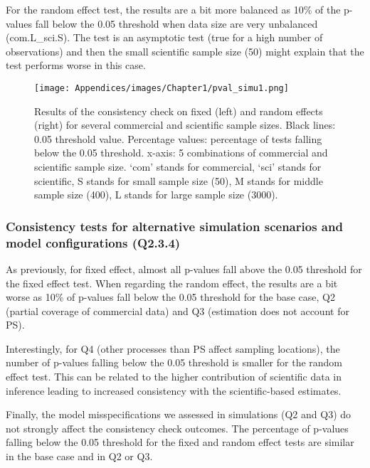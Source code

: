 For the random effect test, the results are a bit more balanced as 10\% of the p-values fall below the 0.05 threshold when data size are very unbalanced (com.L_sci.S). The test is an asymptotic test (true for a high number of observations) and then the small scientific sample size (50) might explain that the test performs worse in this case.

\begin{figure}[H]
   \begin{center}
      \texttt{[image: Appendices/images/Chapter1/pval\_simu1.png]}
   \end{center}
   \caption[Results of the consistency check on fixed (left) and random effects (right) for several commercial and scientific sample sizes.]
   {Results of the consistency check on fixed (left) and random effects (right) for several commercial and scientific sample sizes. Black lines: 0.05 threshold value. Percentage values: percentage of tests falling below the 0.05 threshold. x-axis: 5 combinations of commercial and scientific sample size. ‘com’ stands for commercial, ‘sci’ stands for scientific, S stands for small sample size (50), M stands for middle sample size (400), L stands for large sample size (3000).}
   \label{fig:PvalSimu1}
\end{figure}

\clearpage

\subsubsection{Consistency tests for alternative simulation scenarios and model configurations (Q2.3.4)}\label{appendix:PvalSimu2}

As previously, for fixed effect, almost all p-values fall above the 0.05 threshold for the fixed effect test. When regarding the random effect, the results are a bit worse as 10\% of p-values fall below the 0.05 threshold for the base case, Q2 (partial coverage of commercial data) and Q3 (estimation does not account for PS).

Interestingly, for Q4 (other processes than PS affect sampling locations), the number of p-values falling below the 0.05 threshold is smaller for the random effect test. This can be related to the higher contribution of scientific data in inference leading to increased consistency with the scientific-based estimates.

Finally, the model misspecifications we assessed in simulations (Q2 and Q3) do not strongly affect the consistency check outcomes. The percentage of p-values falling below the 0.05 threshold for the fixed and random effect tests are similar in the base case and in Q2 or Q3.

